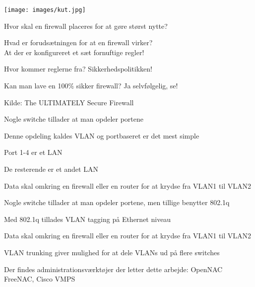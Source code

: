 \documentclass[Screen16to9,17pt]{foils}
\begin{document}

\begin{center}
\colorbox{white}{\texttt{[image: images/kut.jpg]}}
\end{center}

\begin{list2}
\item Hvor skal en firewall placeres for at gøre størst nytte?
\item Hvad er forudsætningen for at en firewall virker?\\
At der er konfigureret et sæt fornuftige regler!
\item Hvor kommer reglerne fra? Sikkerhedspolitikken!
\item Kan man lave en 100\% sikker firewall? Ja selvfølgelig, se!
\end{list2}


{\small Kilde:  The ULTIMATELY Secure Firewall}





\begin{list1}
\item Nogle switche tillader at man opdeler portene
\item Denne opdeling kaldes VLAN og portbaseret er det mest simple
\item Port 1-4 er et LAN
\item De resterende er et andet LAN
\item Data skal omkring en firewall eller en router for at krydse fra VLAN1 til VLAN2
\end{list1}



\begin{list1}
\item Nogle switche tillader at man opdeler portene, men tillige benytter 802.1q
\item Med 802.1q tillades VLAN tagging på Ethernet niveau
\item Data skal omkring en firewall eller en router for at krydse fra VLAN1 til VLAN2
\item VLAN trunking giver mulighed for at dele VLANs ud på flere switches
\item Der findes administrationsværktøjer der letter dette arbejde: OpenNAC FreeNAC, Cisco VMPS
\end{list1}
\end{document}

